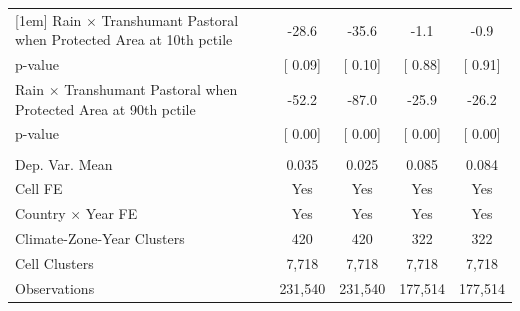 {\begin{tabular}{l*{4}{c}}
[1em] \hspace{15pt} Rain $\times$ Transhumant Pastoral when Protected Area at 10th pctile&       -28.6         &       -35.6         &        -1.1         &        -0.9         \\
\hspace{25pt} p-value& [     0.09]         & [     0.10]         & [     0.88]         & [     0.91]         \\
[1em]\hspace{15pt} Rain $\times$ Transhumant Pastoral when Protected Area at 90th pctile&       -52.2         &       -87.0         &       -25.9         &       -26.2         \\
\hspace{25pt} p-value& [     0.00]         & [     0.00]         & [     0.00]         & [     0.00]         \\
\hline \\ Dep. Var. Mean&       0.035         &       0.025         &       0.085         &       0.084         \\
Cell FE             &         Yes         &         Yes         &         Yes         &         Yes         \\
Country $\times$ Year FE&         Yes         &         Yes         &         Yes         &         Yes         \\
Climate-Zone-Year Clusters&         420         &         420         &         322         &         322         \\
Cell Clusters       &       7,718         &       7,718         &       7,718         &       7,718         \\
Observations        &     231,540         &     231,540         &     177,514         &     177,514         \\
\bottomrule
\end{tabular}
}
